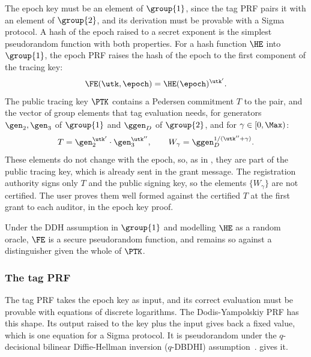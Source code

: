 The epoch key must be an element of $\group{1}$, since the tag PRF pairs it with
an element of $\group{2}$, and its derivation must be provable with a Sigma
protocol. A hash of the epoch raised to a secret exponent is the simplest
pseudorandom function with both properties. For a hash function $\HE$ into
$\group{1}$, the epoch PRF raises the hash of the epoch to the first component
of the tracing key:
%
\begin{equation*}
  \FE(\utk, \epoch) = \HE(\epoch)^{\utk'}.
\end{equation*}
%
The public tracing key $\PTK$ contains a Pedersen commitment $T$ to the pair,
and the vector of group elements that tag evaluation needs, for generators
$\gen_2, \gen_3$ of $\group{1}$ and $\ggen_D$ of $\group{2}$, and for $\gamma \in
[0,\Max)$:
%
\begin{equation*}
  T = \gen_2^{\utk'}\cdot\gen_3^{\utk''}, \qquad W_\gamma =
\ggen_D^{1/(\utk''+\gamma)}.
\end{equation*}
%
These elements do not change with the epoch, so, as in
, they are part of the public tracing key, which is
already sent in the grant message. The registration authority signs only $T$ and the public signing key,
so the elements $\{W_\gamma\}$ are not certified. The user proves them well
formed against the certified $T$ at the first grant to each auditor, in the
epoch key proof.

\begin{lemma}\label{lem:txid-fe-prf}
  Under the DDH assumption in $\group{1}$ and modelling
$\HE$ as a random oracle, $\FE$ is a secure pseudorandom function, and remains
so against a distinguisher given the whole of $\PTK$.
%
\end{lemma}

\subsubsection{The tag PRF}\label{sec:txid-ft}

The tag PRF takes the epoch key as input, and its correct evaluation must be
provable with equations of discrete logarithms. The Dodis-Yampolskiy PRF has
this shape. Its output raised to the key plus the input gives back a fixed
value, which is one equation for a Sigma protocol. It is pseudorandom under the $q$-decisional bilinear Diffie-Hellman inversion
($q$-DBDHI) assumption~\cite{PKC:DodYam05}.  gives it.

